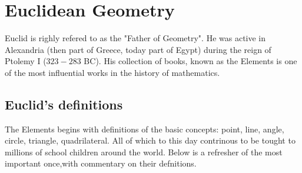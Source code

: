 \section{Euclidean Geometry}
Euclid is righly refered to as the "Father of Geometry". He was active in Alexandria (then part of Greece, today part of Egypt) during the reign of Ptolemy I ($323-283$ BC). His collection of books, known as the Elements is one of the most influential works in the history of mathematics. 

\subsection{Euclid's definitions}
The Elements begins with definitions of the basic concepts: point, line, angle, circle, triangle, quadrilateral. All of which to this day contrinous to be tought to millions of school children around the world. Below is a refresher of the most important once,with commentary on their defnitions.

